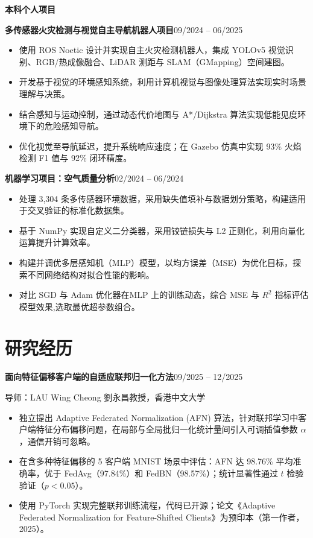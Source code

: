 \documentclass[a4paper,10pt]{article}
\newcommand{\entry}[2]{%
  \noindent\textbf{#1}\hfill#2\par%
}
\newcommand{\subline}[1]{%
  \noindent#1\par%
}
\begin{document}
\vspace{6pt}
\noindent\textbf{本科个人项目}

\vspace{3pt}
\entry{多传感器火灾检测与视觉自主导航机器人项目}{09/2024 -- 06/2025}
\begin{itemize}
  \item 使用 ROS Noetic 设计并实现自主火灾检测机器人，集成 YOLOv5 视觉识别、RGB/热成像融合、LiDAR 测距与 SLAM（GMapping）空间建图。
  \item 开发基于视觉的环境感知系统，利用计算机视觉与图像处理算法实现实时场景理解与决策。
  \item 结合感知与运动控制，通过动态代价地图与 A*/Dijkstra 算法实现低能见度环境下的危险感知导航。
  \item 优化视觉至导航延迟，提升系统响应速度；在 Gazebo 仿真中实现 93\% 火焰检测 F1 值与 92\% 闭环精度。
\end{itemize}

\vspace{5pt}
\entry{机器学习项目：空气质量分析}{02/2024 -- 06/2024}
\begin{itemize}
  \item 处理 3,304 条多传感器环境数据，采用缺失值填补与数据划分策略，构建适用于交叉验证的标准化数据集。
  \item 基于 NumPy 实现自定义二分类器，采用铰链损失与 L2 正则化，利用向量化运算提升计算效率。
  \item 构建并调优多层感知机（MLP）模型，以均方误差（MSE）为优化目标，探索不同网络结构对拟合性能的影响。
  \item 对比 SGD 与 Adam 优化器在MLP 上的训练动态，综合 MSE 与 $R^2$ 指标评估模型效果,选取最优超参数组合。
\end{itemize}

\section*{研究经历}

\entry{面向特征偏移客户端的自适应联邦归一化方法}{09/2025 -- 12/2025}
\subline{导师：LAU Wing Cheong 劉永昌教授，香港中文大学}
\begin{itemize}
  \item 独立提出 Adaptive Federated Normalization (AFN) 算法，针对联邦学习中客户端特征分布偏移问题，在局部与全局批归一化统计量间引入可调插值参数 $\alpha$，通信开销可忽略。
  \item 在含多种特征偏移的 5 客户端 MNIST 场景中评估：AFN 达 98.76\% 平均准确率，优于 FedAvg（97.84\%）和 FedBN（98.57\%）；统计显著性通过 $t$ 检验验证（$p < 0.05$）。
  \item 使用 PyTorch 实现完整联邦训练流程，代码已开源；论文《Adaptive Federated Normalization for Feature-Shifted Clients》为预印本（第一作者，2025）。
\end{itemize}
\end{document}
